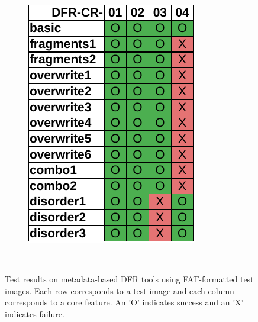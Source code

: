 \begin{figure}
\begin{subfigure}[b]{0.3\linewidth}
        \includegraphics[width=\linewidth]{fig/axiom_results_fat.pdf}
    \end{subfigure}~~
        
    \caption{Test results on metadata-based DFR tools using FAT-formatted test images. Each row corresponds to a test image and each column corresponds to a core feature. An 'O' indicates success and an 'X' indicates failure.}
    \label{fig:results_fat}
\end{figure}

